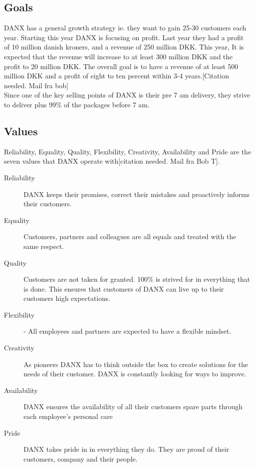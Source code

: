 \subsection{Goals}
DANX has a general growth strategy ie. they want to gain 25-30 customers each year. Starting this year DANX is focusing on profit. Last year they had a profit of 10 million danish kroners, and a revenue of 250 million DKK. This year, It is expected that the revenue will increase to at least 300 million DKK and the profit to 20 million DKK. The overall goal is to have a revenue of at least 500 million DKK and a profit of eight to ten percent within 3-4 years.[Citation needed. Mail fra bob] \\

Since one of the key selling points of DANX is their pre 7 am delivery, they strive to deliver plus 99\% of the packages before 7 am.

\subsection{Values}
Reliability, Equality, Quality, Flexibility, Creativity, Availability and Pride are the seven values that DANX operate with[citation needed. Mail fra Bob T].

\begin{description}

\item[Reliability] DANX keeps their promises, correct their mistakes and proactively informs their customers.
\item[Equality] Customers, partners and colleagues are all equals and treated with the same respect.
\item[Quality] Customers are not taken for granted. 100\% is strived for in everything that is done. This ensures that customers of DANX can live up to their customers high expectations.
\item[Flexibility] - All employees and partners are expected to have a flexible mindset.
\item[Creativity] As pioneers DANX has to think outside the box to create solutions for the needs of their customer. DANX is constantly looking for ways to improve.
\item[Availability] DANX ensures the availability of all their customers spare parts through each employee’s personal care
\item[Pride] DANX takes pride in in everything they do. They are proud of their customers, company and their people.

\end{description}

